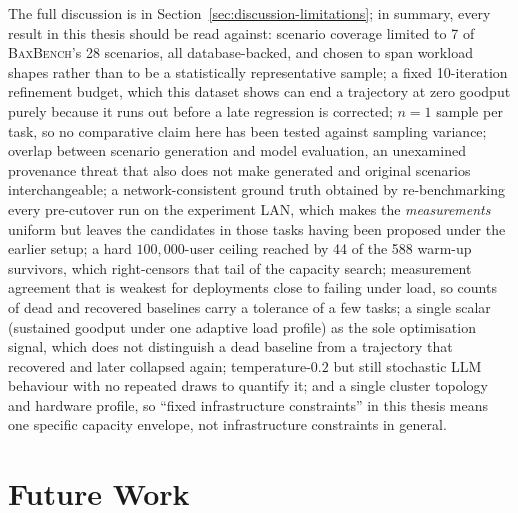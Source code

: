 The full discussion is in Section~\ref{sec:discussion-limitations}; in
summary, every result in this thesis should be read against: scenario
coverage limited to 7 of \textsc{BaxBench}'s 28 scenarios, all
database-backed, and chosen to span workload shapes rather than to be a
statistically representative sample; a fixed 10-iteration refinement
budget, which this dataset shows can end a trajectory at zero goodput
purely because it runs out before a late regression is corrected; $n=1$
sample per task, so no comparative claim here has been tested against
sampling variance; overlap between scenario generation and model evaluation,
an unexamined provenance threat that also does not make generated
and original scenarios interchangeable; a network-consistent ground truth
obtained by re-benchmarking every pre-cutover run on the experiment LAN,
which makes the \emph{measurements} uniform but leaves the candidates in
those tasks having been proposed under the earlier setup; a hard
$100{,}000$-user ceiling reached by 44 of the 588 warm-up survivors, which
right-censors that tail of the capacity search; measurement agreement that
is weakest for deployments close to failing under load, so counts of dead
and recovered baselines carry a tolerance of a few tasks; a single scalar (sustained
goodput under one adaptive load profile) as the sole optimisation signal,
which does not distinguish a dead baseline from a trajectory that recovered
and later collapsed again; temperature-$0.2$ but still stochastic LLM
behaviour with no repeated draws to quantify it; and a single cluster
topology and hardware profile, so ``fixed infrastructure constraints'' in
this thesis means one specific capacity envelope, not infrastructure
constraints in general.


\section{Future Work}
\label{sec:conclusion-future-work}

